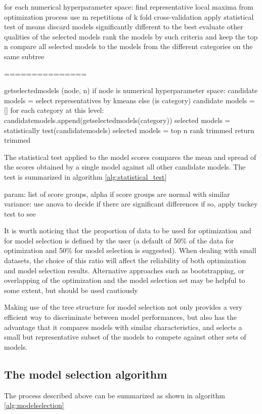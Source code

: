 for each numerical hyperparameter space:
	find representative local maxima from optimization process
	use m repetitions of k fold cross-validation 
	apply statistical test of means
	discard models significantly different to the best
	evaluate other qualities of the selected models 
	rank the models by such criteria and keep the top n
	compare all selected models to the models from the different categories on the same subtree

===============

getselectedmodels (node, n)
if node is numerical hyperparameter space:
	candidate models = select representatives by kmeans
else (is category)
	candidate models = []
	for each category at this level:
		candidatemodels.append(getselectedmodels(category))
selected models = statistically test(candidatemodels)
selected models = top n rank trimmed
return trimmed


The statistical test applied to the model scores compares the mean and spread of the scores
obtained by a single model against all other candidate models. The test is summarized in algorithm
\ref{alg:statistical_test}

param: list of score groups, alpha
if score groups are normal with similar variance:
	use anova to decide if there are significant differences
	if so, apply tuckey test to see 


It is worth noticing that the proportion of data to be used for optimization and for model selection
is defined by the user (a default of 50\% of the data for optimization and 50\% for model selection
is suggested). When dealing with small datasets, the choice of this ratio will affect the
reliability of both optimization and model selection results. Alternative approaches such as
bootstrapping, or overlapping of the optimization and the model selection set may be helpful to some
extent, but should be used cautiously 

Making use of the tree structure for model selection not only provides a very efficient way to
discriminate between model performances, but also has the advantage that it compares models with
similar characteristics, and selects a small but representative subset of the models to compete
against other sets of models.

\subsection{The model selection algorithm}
The process described above can be summarized as shown in algorithm \ref{alg:modelselection}

